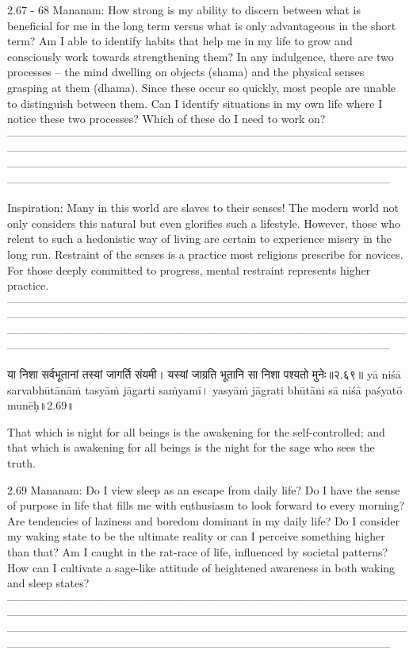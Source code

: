2.67 - 68 Mananam:
How strong is my ability to discern between what is beneficial for me in the long term versus what is only advantageous in the  short term? Am I able to identify habits that help me in my life to grow and consciously work towards strengthening them?
In any indulgence, there are two processes – the mind dwelling on objects (shama) and the physical senses grasping at them (dhama). Since these occur so quickly, most people are unable to distinguish between them. Can I identify situations in my own life where I notice these two processes? Which of these do I need to work on?
—-----------------------------------------------------------------------------------------------------------------------------------------------------------------------------------------------------------------------------------------------------------------------------------------------------------------------------------------------------------------------------------------------------------------------------------------

Inspiration: 
Many in this world are slaves to their senses! The modern world not only considers this natural but even glorifies such a lifestyle. However, those who relent to such a hedonistic way of living are certain to experience misery in the long run. Restraint of the senses is a practice most religions prescribe for novices. For those deeply committed to progress, mental restraint represents higher practice.
—-----------------------------------------------------------------------------------------------------------------------------------------------------------------------------------------------------------------------------------------------------------------------------------------------------------------------------------------------------------------------------------------------------------------------------------------


या निशा सर्वभूतानां तस्यां जागर्ति संयमी। 
यस्यां जाग्रति भूतानि सा निशा पश्यतो मुनेः॥२.६९॥
yā niśā sarvabhūtānāṁ tasyāṁ jāgarti saṁyamī। 
yasyāṁ jāgrati bhūtāni sā niśā paśyatō munēḥ॥2.69॥

That which is night for all beings is the awakening for the self-controlled; and that which is awakening for all beings is the night for the sage who sees the truth.

2.69 Mananam:
Do I view sleep as an escape from daily life? Do I have the sense of purpose in life that fills me with enthusiasm to look forward to every morning? Are tendencies of laziness and boredom dominant in my daily life?
Do I consider my waking state to be the ultimate reality or can I perceive something higher than that? Am I caught in the rat-race of life, influenced by societal patterns? How can I cultivate a sage-like attitude of heightened awareness in both waking and sleep states?
—-----------------------------------------------------------------------------------------------------------------------------------------------------------------------------------------------------------------------------------------------------------------------------------------------------------------------------------------------------------------------------------------------------------------------------------------
 
